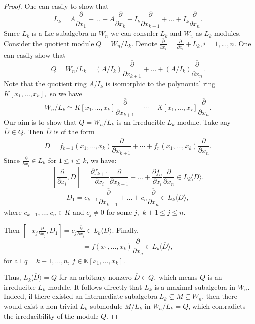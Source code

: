 \documentclass[10pt,a4paper]{amsart}
\begin{document}
	\begin{proof} One can easily to show that 
		$$L_k=A\frac{\partial}{\partial x_1} + \dots +A\frac{\partial}{\partial x_k} + I_k \frac{\partial}{\partial x_{k+1}} + \dots + I_k \frac{\partial}{\partial x_n}.
		$$
		Since $L_k$ is a Lie subalgebra in $W_n$ we can consider $L_k$  and $W_n$ as   $L_k$-modules.  
		Consider the quotient module $Q=W_n/L_k.$ Denote ${\frac{\overline{\partial}}{\partial x_i}}=\frac{\partial}{\partial x_i}+L_k, i=1, \ldots , n.$ One can easily  show that 
		$$			Q = W_n / L_k=(A/I_k){\frac{\overline{\partial}}{\partial x_{k+1}}} + \dots + (A/I_k){\frac{\overline{\partial}}{\partial x_n}}.$$
		Note that the quotient ring $A/I_k $ is isomorphic to the polynomial ring $K[x_1, \dots, x_k],$ so we have  
		$$W_n/L_k\simeq {K}[x_1, \dots, x_k]{\frac{\overline{\partial}}{\partial x_{k+1}}}+\cdots + {K}[x_1, \dots, x_k]{\frac{\overline{\partial}}{\partial x_n}}.
		$$
		Our aim is to show that $Q=W_n/L_k$ is an irreducible $L_k$-module. 
		Take any $\overline{D}\in Q.$	Then $\overline{D}$ is of the form  
		$$		
		\overline{D} = f_{k+1}(x_1, \dots, x_k){\frac{\overline{\partial}}{\partial x_{k+1}}} + \cdots + f_n(x_1, \dots, x_k){\frac{\overline{\partial}}{\partial x_n}}.
		$$	
		Since  $\frac{\partial}{\partial x_i} \in L_k$ for $1 \le i \le k$, we have:
		$$[\frac{\partial}{\partial x_i},  \overline{D}] = \frac{\partial f_{k+1}}{\partial x_i} \frac{\overline{\partial}}{\partial x_{k+1}} + \dots + \frac{\partial f_n}{\partial x_i} \frac{\overline{\partial}}{\partial x_n} \in L_k\langle \overline{D}\rangle .
		$$
		$$	\overline{D}_1 = c_{k+1}\frac{\overline{\partial}}{\partial x_{k+1}} + \dots + c_n \frac{\overline{\partial}}{\partial x_n} \in L_k\langle \overline{D}\rangle ,
		$$
		where $c_{k+1}, \dots, c_n \in K$ and $c_j \ne 0$ for some $j,$ $k+1\leq j\leq n.$
		
		Then $[-x_j \frac{\partial}{\partial x_j}, \overline{D}_1] = c_j \frac{\overline{\partial}}{\partial x_j} \in L_k \langle \overline{D} \rangle$.
		Finally, 
		\begin{equation*}
			[-x_j f(x_1, \dots, x_k) \frac{\partial}{\partial x_q}, \frac{\overline{\partial}}{\partial x_j}] = f(x_1, \dots , x_k) \frac{\partial}{\partial x_q} \in L_k \langle \overline{D} \rangle,
		\end{equation*} 
		for all $q = k+1,\dots,n$, $f \in \mathbb{K}[x_1, \dots, x_k]$.
		
		Thus, $L_k \langle \overline{D} \rangle = Q$ for an arbitrary nonzero $\overline{D} \in Q, $ which means $Q$ is an irreducible $L_k$-module.
		It follows directly that $L_k$ is a maximal subalgebra in $W_n$. 
		Indeed, if there existed an intermediate subalgebra $L_k \subsetneq M \subsetneq W_n$, then there would exist a non-trivial $L_k$-submodule $M/L_k$ in $W_n/L_k = Q$, which contradicts the irreducibility of the module $Q$.
	\end{proof}
\end{document}
